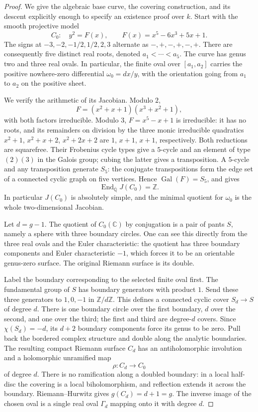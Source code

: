 \documentclass[11pt,a4paper]{article}
\theoremstyle{definition}
\theoremstyle{remark}
\numberwithin{equation}{section}
\newcommand{\Qbar}{\overline{\mathbb Q}}
\begin{document}
\begin{proof}
We give the algebraic base curve, the covering construction, and its
descent explicitly enough to specify an existence proof over $k$.
Start with the smooth projective model
\begin{equation}\label{dd-base-curve}
 C_0:\quad y^2=F(x),\qquad F(x)=x^5-6x^3+5x+1.
\end{equation}
The signs at $-3,-2,-1/2,1/2,2,3$ alternate as
$-,+,-,+,-,+$.  There are consequently five distinct real roots,
denoted $a_1<\cdots<a_5$.  The curve has genus two and three real
ovals.  In particular, the finite oval over $[a_1,a_2]$ carries the
positive nowhere-zero differential $\omega_0=dx/y$, with the
orientation going from $a_1$ to $a_2$ on the positive sheet.

We verify the arithmetic of its Jacobian.  Modulo $2$,
\[
 F=(x^2+x+1)(x^3+x^2+1),
\]
with both factors irreducible.  Modulo $3$, $F=x^5-x+1$ is
irreducible: it has no roots, and its remainders on division by the
three monic irreducible quadratics
$x^2+1$, $x^2+x+2$, $x^2+2x+2$ are $1$, $x+1$, $x+1$,
respectively.  Both reductions are squarefree.  Their Frobenius
cycle types give a $5$-cycle and an element of type $(2)(3)$ in the
Galois group; cubing the latter gives a transposition.  A $5$-cycle
and any transposition generate $S_5$: the conjugate transpositions
form the edge set of a connected cyclic graph on five vertices.
Hence $\operatorname{Gal}(F)=S_5$, and
\cite[Theorem~2.1]{dd-Zarhin2000} gives
\begin{equation}\label{dd-end-base}
 \operatorname{End}_{\Qbar}J(C_0)=\mathbb Z.
\end{equation}
In particular $J(C_0)$ is absolutely simple, and the minimal quotient
for $\omega_0$ is the whole two-dimensional Jacobian.

Let $d=g-1$.  The quotient of $C_0(\mathbb C)$ by conjugation is a
pair of pants $S$, namely a sphere with three boundary circles.  One
can see this directly from the three real ovals and the Euler
characteristic: the quotient has three boundary components and Euler
characteristic $-1$, which forces it to be an orientable genus-zero
surface.  The original Riemann surface is its double.

Label the boundary corresponding to the selected finite oval first.
The fundamental group of $S$ has boundary generators with product
$1$.  Send these three generators to $1,0,-1$ in $\mathbb Z/d\mathbb Z$.
This defines a connected cyclic cover $S_d\to S$ of degree $d$.
There is one boundary circle over the first boundary, $d$ over the
second, and one over the third; the first and third are degree-$d$
covers.  Since $\chi(S_d)=-d$, its $d+2$ boundary components force
its genus to be zero.  Pull back the bordered complex structure and
double along the analytic boundaries.  The resulting compact
Riemann surface $C_d$ has an antiholomorphic involution and a
holomorphic unramified map
\[
 \rho:C_d\longrightarrow C_0
\]
of degree $d$.  There is no ramification along a doubled boundary:
in a local half-disc the covering is a local biholomorphism, and
reflection extends it across the boundary.  Riemann--Hurwitz gives
$g(C_d)=d+1=g$.  The inverse image of the chosen oval is a single
real oval $\Gamma_d$ mapping onto it with degree $d$.


\end{proof}
\end{document}
